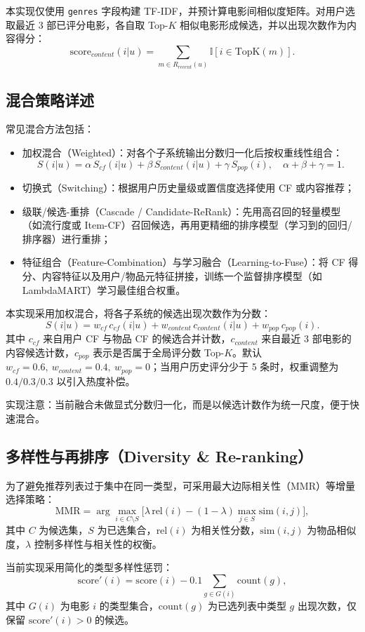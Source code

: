 本实现仅使用 \texttt{genres} 字段构建 TF-IDF，并预计算电影间相似度矩阵。对用户选取最近 3 部已评分电影，各自取 Top-$K$ 相似电影形成候选，并以出现次数作为内容得分：
$$
\text{score}_{content}(i|u)=\sum_{m\in R_{recent}(u)} \mathbb{I}[i\in \text{TopK}(m)].
$$

\subsection{混合策略详述}
常见混合方法包括：
\begin{itemize}
  \item 加权混合（Weighted）：对各个子系统输出分数归一化后按权重线性组合：
  $$S(i|u)=\alpha\,S_{cf}(i|u)+\beta\,S_{content}(i|u)+\gamma\,S_{pop}(i),\quad \alpha+\beta+\gamma=1.$$ 
  \item 切换式（Switching）：根据用户历史量级或置信度选择使用 CF 或内容推荐；
  \item 级联/候选-重排（Cascade / Candidate-ReRank）：先用高召回的轻量模型（如流行度或 Item-CF）召回候选，再用更精细的排序模型（学习到的回归/排序器）进行重排；
  \item 特征组合（Feature-Combination）与学习融合（Learning-to-Fuse）：将 CF 得分、内容特征以及用户/物品元特征拼接，训练一个监督排序模型（如 LambdaMART）学习最佳组合权重。
\end{itemize}

本实现采用加权混合，将各子系统的候选出现次数作为分数：
$$
S(i|u)=w_{cf}\,c_{cf}(i|u)+w_{content}\,c_{content}(i|u)+w_{pop}\,c_{pop}(i).
$$
其中 $c_{cf}$ 来自用户 CF 与物品 CF 的候选合并计数，$c_{content}$ 来自最近 3 部电影的内容候选计数，$c_{pop}$ 表示是否属于全局评分数 Top-$K$。默认 $w_{cf}=0.6,\ w_{content}=0.4,\ w_{pop}=0$；当用户历史评分少于 5 条时，权重调整为 $0.4/0.3/0.3$ 以引入热度补偿。

实现注意：当前融合未做显式分数归一化，而是以候选计数作为统一尺度，便于快速混合。

\subsection{多样性与再排序（Diversity \& Re-ranking）}
为了避免推荐列表过于集中在同一类型，可采用最大边际相关性（MMR）等增量选择策略：
$$\text{MMR} = \arg\max_{i\in C\setminus S} \bigl[\lambda\,\text{rel}(i)- (1-\lambda)\max_{j\in S}\text{sim}(i,j)\bigr],$$
其中 $C$ 为候选集，$S$ 为已选集合，$\text{rel}(i)$ 为相关性分数，$\text{sim}(i,j)$ 为物品相似度，$\lambda$ 控制多样性与相关性的权衡。

当前实现采用简化的类型多样性惩罚：
$$
\text{score}'(i)=\text{score}(i)-0.1\sum_{g\in G(i)}\text{count}(g),
$$
其中 $G(i)$ 为电影 $i$ 的类型集合，$\text{count}(g)$ 为已选列表中类型 $g$ 出现次数，仅保留 $\text{score}'(i)>0$ 的候选。

